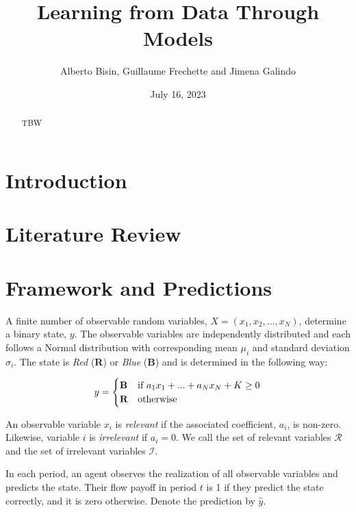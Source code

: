 \documentclass[
  12pt,
]{article}
\title{Learning from Data Through Models}
\author{Alberto Bisin, Guillaume Frechette and Jimena Galindo}
\date{July 16, 2023}
\begin{document}
\maketitle
\begin{abstract}
TBW
\end{abstract}

\hypertarget{introduction}{%
\section{Introduction}\label{introduction}}

\hypertarget{literature-review}{%
\section{Literature Review}\label{literature-review}}

\hypertarget{framework-and-predictions}{%
\section{Framework and Predictions}\label{framework-and-predictions}}

A finite number of observable random variables,
\(X =(x_1, x_2, ..., x_N)\), determine a binary state, \(y\). The
observable variables are independently distributed and each follows a
Normal distribution with corresponding mean \(\mu_i\) and standard
deviation \(\sigma_i\). The state is \emph{Red} (\textbf{R}) or
\emph{Blue} (\textbf{B}) and is determined in the following way:

\begin{equation*}
y = \begin{cases}
\text{\textbf{B}} &\text{if $a_1x_1+...+a_Nx_N + K\geq0$}\\
\text{\textbf{R}} &\text{otherwise}
\end{cases}
\end{equation*}

An observable variable \(x_i\) is \emph{relevant} if the associated
coefficient, \(a_i\), is non-zero. Likewise, variable \(i\) is
\emph{irrelevant} if \(a_i = 0\). We call the set of relevant variables
\(\mathcal{R}\) and the set of irrelevant variables \(\mathcal{I}\).

In each period, an agent observes the realization of all observable
variables and predicts the state. Their flow payoff in period \(t\) is 1
if they predict the state correctly, and it is zero otherwise. Denote
the prediction by \(\hat{y}\).
\end{document}
